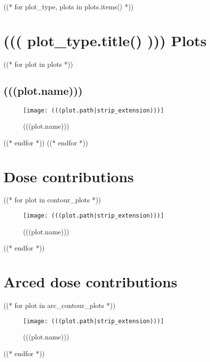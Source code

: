 \documentclass[12pt]{article}
\begin{document}
\clearpage

\tableofcontents


((* for plot_type, plots in plots.items() *))
	\section{((( plot_type.title() ))) Plots}
		((* for plot in plots *))
			\subsection{(((plot.name)))}
			\begin{figure}[H]
			\centering
			\texttt{[image: (((plot.path|strip\_extension)))]}
			\caption{(((plot.name)))}
			\label{fig:(((plot.slug)))}
			\end{figure}
		((* endfor *))
((* endfor *))

\section{Dose contributions}

((* for plot in contour_plots *))
	\begin{figure}[H]
	\centering
	\texttt{[image: (((plot.path|strip\_extension)))]}
	\caption{(((plot.name)))}
	\label{fig:(((plot.slug)))}
	\end{figure}
((* endfor *))

\section{Arced dose contributions}
((* for plot in arc_contour_plots *))
	\begin{figure}[H]
	\centering
	\texttt{[image: (((plot.path|strip\_extension)))]}
	\caption{(((plot.name)))}
	\label{fig:(((plot.slug)))}
	\end{figure}
((* endfor *))
\end{document}
